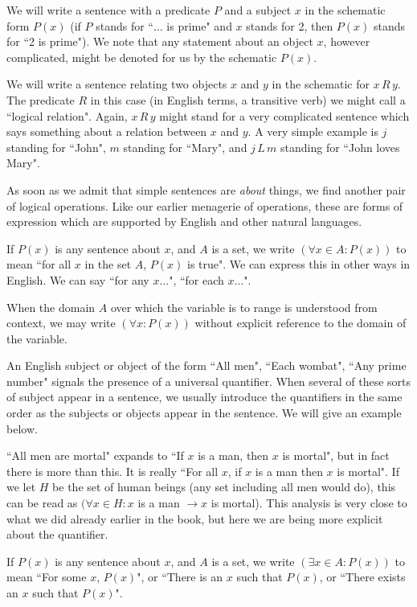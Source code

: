 \documentclass[12pt]{article}
\begin{document}
We will write a sentence with a predicate $P$ and a subject $x$ in the schematic form $P(x)$ (if $P$ stands for ``$\ldots$ is prime" and $x$ stands for 2, then $P(x)$ stands for ``2 is prime").  We note that any statement about an object $x$, however complicated, might be denoted for us by the schematic $P(x)$.

We will write a sentence relating two objects $x$ and $y$ in the schematic for $x \, R \, y$.  The predicate $R$ in this case (in English terms, a transitive verb) we might call a ``logical relation".  Again, $x\,R\,y$ might stand for a very complicated sentence which says something about a relation between $x$ and $y$.  A very simple example is $j$ standing for ``John", $m$ standing for ``Mary", and $j\,L\,m$ standing for ``John loves Mary".

As soon as we admit that simple sentences are {\em about\/} things, we find another pair of logical operations.  Like our earlier menagerie of operations, these are forms of expression which are supported by English and other natural languages.

If $P(x)$ is any sentence about $x$, and $A$ is a set, we write $(\forall x \in A:P(x))$ to mean ``for all $x$ in the set $A$, $P(x)$ is true".
We can express this in other ways in English.  We can say ``for any $x\ldots$", ``for each $x\ldots$".

When the domain $A$ over which the variable is to range is understood from context, we may write
$(\forall x:P(x))$ without explicit reference to the domain of the variable.

An English subject or object of the form ``All men",  ``Each wombat", ``Any prime number" signals the presence of a universal quantifier.
When several of these sorts of subject appear in a sentence, we usually introduce the quantifiers in the same order as the subjects or objects
appear in the sentence.  We will give an example below.

``All men are mortal" expands to ``If $x$ is a man, then $x$ is mortal", but in fact there is more than this.  It is really ``For all $x$, if $x$ is a man then $x$ is mortal".  If we let $H$ be the set of human beings (any set including all men would do), this can be read as $(\forall x \in H:x$ is a man $\rightarrow x$ is mortal).  This analysis is very close to what we did already earlier in the book, but here we are being more explicit about the quantifier.

If $P(x)$ is any sentence about $x$, and $A$ is a set, we write $(\exists x \in A:P(x))$ to mean ``For some $x$, $P(x)$", or ``There is an $x$ such that $P(x)$, or ``There exists an $x$ such that $P(x)$".
\end{document}
